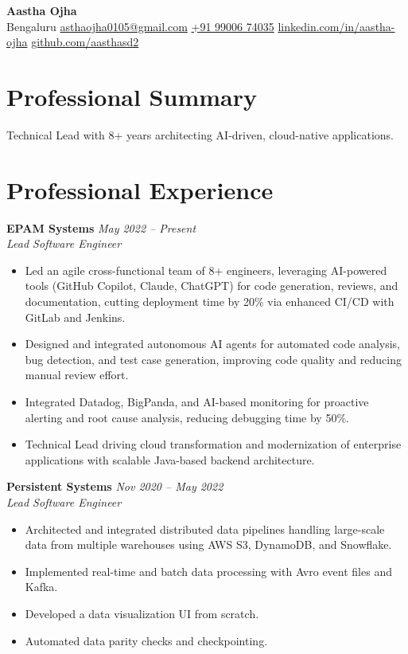 \documentclass[10pt,letterpaper]{article}
\begin{document}
{\LARGE \textbf{Aastha Ojha}}\\[0.25em]
Bengaluru \textbar{}
\href{mailto:asthaojha0105@gmail.com}{asthaojha0105@gmail.com} \textbar{}
\href{tel:+919900674035}{+91 99006 74035} \textbar{}
\href{https://www.linkedin.com/in/aastha-ojha/}{linkedin.com/in/aastha-ojha} \textbar{}
\href{https://github.com/aasthasd2}{github.com/aasthasd2}

\vspace{0.6em}

\section*{Professional Summary}
Technical Lead with 8+ years architecting AI-driven, cloud-native applications.

\section*{Professional Experience}
\textbf{EPAM Systems} \hfill \textit{May 2022 -- Present}\\
\textit{Lead Software Engineer}
\begin{itemize}
\item Led an agile cross-functional team of 8+ engineers, leveraging AI-powered tools (GitHub Copilot, Claude, ChatGPT) for code generation, reviews, and documentation, cutting deployment time by 20\% via enhanced CI/CD with GitLab and Jenkins.
\item Designed and integrated autonomous AI agents for automated code analysis, bug detection, and test case generation, improving code quality and reducing manual review effort.
\item Integrated Datadog, BigPanda, and AI-based monitoring for proactive alerting and root cause analysis, reducing debugging time by 50\%.
\item Technical Lead driving cloud transformation and modernization of enterprise applications with scalable Java-based backend architecture.
\end{itemize}

\textbf{Persistent Systems} \hfill \textit{Nov 2020 -- May 2022}\\
\textit{Lead Software Engineer}
\begin{itemize}
\item Architected and integrated distributed data pipelines handling large-scale data from multiple warehouses using AWS S3, DynamoDB, and Snowflake.
\item Implemented real-time and batch data processing with Avro event files and Kafka.
\item Developed a data visualization UI from scratch.
\item Automated data parity checks and checkpointing.
\end{itemize}
\end{document}
